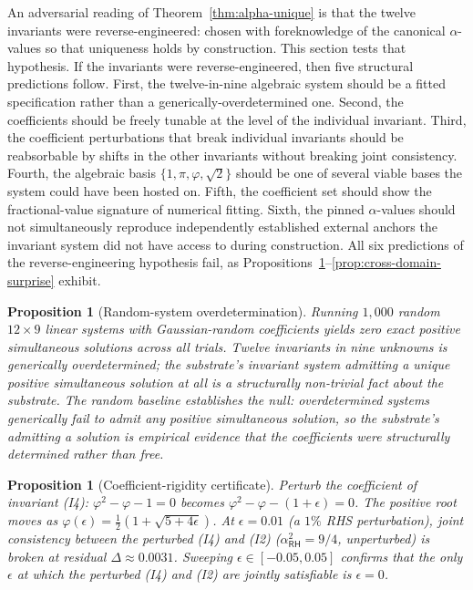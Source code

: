 \documentclass[11pt,a4paper]{amsart}
\theoremstyle{plain}
\newtheorem{proposition}[theorem]{Proposition}
\theoremstyle{definition}
\begin{document}
An adversarial reading of Theorem~\ref{thm:alpha-unique} is that the twelve invariants were reverse-engineered: chosen with foreknowledge of the canonical $\alpha$-values so that uniqueness holds by construction. This section tests that hypothesis. If the invariants were reverse-engineered, then five structural predictions follow. First, the twelve-in-nine algebraic system should be a fitted specification rather than a generically-overdetermined one. Second, the coefficients should be freely tunable at the level of the individual invariant. Third, the coefficient perturbations that break individual invariants should be reabsorbable by shifts in the other invariants without breaking joint consistency. Fourth, the algebraic basis $\{1, \pi, \varphi, \sqrt{2}\}$ should be one of several viable bases the system could have been hosted on. Fifth, the coefficient set should show the fractional-value signature of numerical fitting. Sixth, the pinned $\alpha$-values should not simultaneously reproduce independently established external anchors the invariant system did not have access to during construction. All six predictions of the reverse-engineering hypothesis fail, as Propositions~\ref{prop:random-baseline}--\ref{prop:cross-domain-surprise} exhibit.

\begin{proposition}[Random-system overdetermination]\label{prop:random-baseline}
Running $1{,}000$ random $12 \times 9$ linear systems with Gaussian-random coefficients yields zero exact positive simultaneous solutions across all trials. Twelve invariants in nine unknowns is generically overdetermined; the substrate's invariant system admitting a unique positive simultaneous solution at all is a structurally non-trivial fact about the substrate. The random baseline establishes the null: overdetermined systems generically fail to admit any positive simultaneous solution, so the substrate's admitting a solution is empirical evidence that the coefficients were structurally determined rather than free.
\end{proposition}

\begin{proposition}[Coefficient-rigidity certificate]\label{prop:coeff-rigidity}
Perturb the coefficient of invariant \textup{(I4)}: $\varphi^{2} - \varphi - 1 = 0$ becomes $\varphi^{2} - \varphi - (1 + \epsilon) = 0$. The positive root moves as $\varphi(\epsilon) = \tfrac{1}{2}(1 + \sqrt{5 + 4\epsilon})$. At $\epsilon = 0.01$ (a $1\%$ RHS perturbation), joint consistency between the perturbed \textup{(I4)} and \textup{(I2)} ($\alpha_{\textsf{RH}}^{2} = 9/4$, unperturbed) is broken at residual $\Delta \approx 0.0031$. Sweeping $\epsilon \in [-0.05, 0.05]$ confirms that the only $\epsilon$ at which the perturbed \textup{(I4)} and \textup{(I2)} are jointly satisfiable is $\epsilon = 0$.
\end{proposition}
\end{document}
